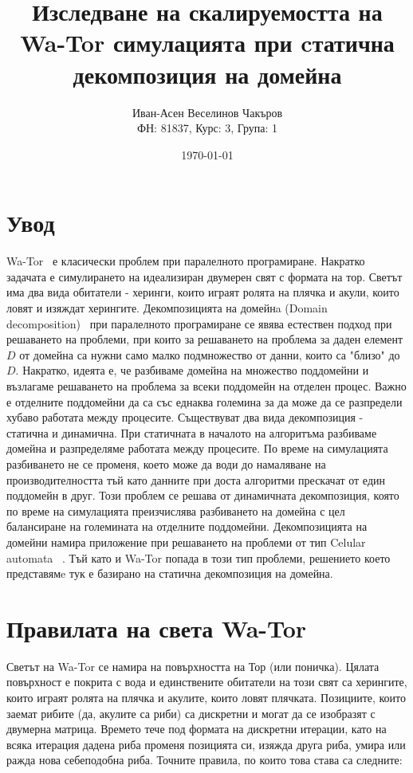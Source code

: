 \documentclass{article}
\title{Изследване на скалируемостта на Wa-Tor симулацията при cтатична декомпозиция на домейна}
\author{Иван-Асен Веселинов Чакъров \\
	ФН: 81837, Курс: 3, Група: 1}
\date{\today}
\begin{document}
\maketitle

\newpage

\tableofcontents

\newpage

\section{Увод}
Wa-Tor~\cite{wator} е класически проблем при паралелното програмиране.
Накратко задачата е симулирането на идеализиран двумерен свят с формата на тор.
Светът има два вида обитатели - херинги, които играят ролята на плячка и акули, които ловят и изяждат херингите.
\bigbreak
Декомпозицията на домейнa (Domain decomposition)~\cite{domain_decomposition}
при паралелното програмиране се явява естествен подход при решаването на проблеми,
при които за решаването на проблема за даден елемент $D$ от домейна са нужни само малко подмножество от данни,
които са "близо" до $D$. Накратко, идеята е, че разбиваме домейна на множество поддомейни
и възлагаме решаването на проблема за всеки поддомейн на отделен процес.
Важно е отделните поддомейни да са със еднаква големина за да може да се разпредели
хубаво работата между процесите. Съществуват два вида декомпозиция - статична и динамична.
При статичната в началото на алгоритъма разбиваме домейна и разпределяме работата между процесите.
По време на симулацията разбиването не се променя, което може да води до намаляване на производителността
тъй като данните при доста алгоритми прескачат от един поддомейн в друг.
Този проблем се решава от динамичната декомпозиция, която по време на симулацията
преизчислява разбиването на домейна с цел балансиране на големината на отделните поддомейни.
Декомпозицията на домейни намира приложение при решаването на проблеми от тип Celular automata ~\cite{celular_automata}.
\bigbreak
Тъй като и Wa-Tor попада в този тип проблеми, решението което представямe тук е базирано
на статична декомпозиция на домейна.

\newpage
\section{Правилата на света Wa-Tor}

Светът на Wa-Tor се намира на повърхността на Тор (или поничка).
Цялата повърхност е покрита с вода и единствените обитатели на този свят са
херингите, които играят ролята на плячка и акулите, които ловят плячката.
Позициите, които заемат рибите (да, акулите са риби) са дискретни и могат да се изобразят с
двумерна матрица. Времето тече под формата на дискретни итерации, като на всяка
итерация дадена риба променя позицията си, изяжда друга риба, умира или ражда
нова себеподобна риба. Точните правила, по които това става са следните:
\end{document}
